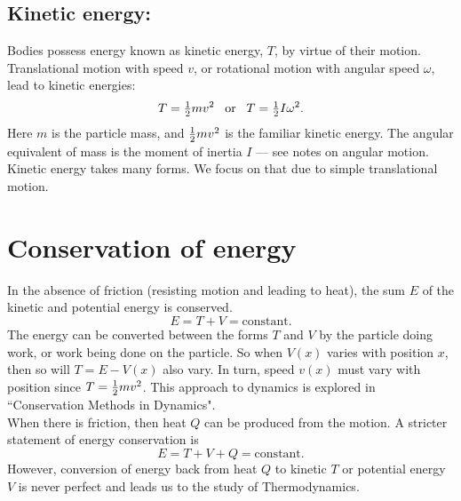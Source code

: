 \subsection{Kinetic energy:}  Bodies possess energy known as kinetic energy, $T$, by virtue of their motion.  Translational motion with speed $v$, or rotational motion with angular speed $\omega$, lead to kinetic energies:
 \begin{equation*} T = {\textstyle \frac{1}{2}} m v^2 \;\;\; \textrm{or} \;\;\; T = {\textstyle \frac{1}{2}} I \omega^2.
\end{equation*}
Here $m$ is the particle mass, and ${\textstyle \frac{1}{2}} m v^2$ is the familiar kinetic energy.  The angular equivalent of mass is the moment of inertia $I$  --- see notes on angular motion.  Kinetic energy takes many forms.  We focus on that due to simple translational motion.

\section{Conservation of energy}
In the absence of friction (resisting motion and leading to heat), the sum $E$ of the kinetic and potential energy is conserved.
\begin{equation*} E = T + V =  \textrm{constant}.
\end{equation*}
The energy can be converted between the forms $T$ and $V$ by the particle doing work, or work being done on the particle. So when $V(x)$ varies with position $x$, then so will $T = E - V(x)$ also vary.  In turn, speed $v(x)$ must vary with position since $T = {\textstyle \frac{1}{2}} m v^2$.  This approach to dynamics is explored in ``Conservation Methods in Dynamics".\\ When there is friction, then heat $Q$ can be produced from the motion.  A stricter statement of energy conservation is
\begin{equation*} E = T + V + Q =  \textrm{constant}.
\end{equation*}
However, conversion of energy  back from heat $Q$ to kinetic $T$ or potential energy $V$ is never perfect and leads us to the study of Thermodynamics.

